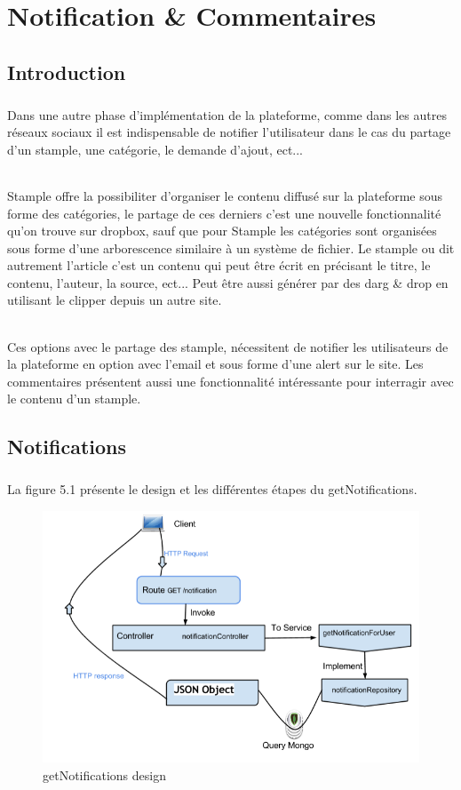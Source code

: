 \chapter{Notification \& Commentaires}
\section{Introduction}
\paragraph{}
Dans une autre phase d'implémentation de la plateforme, comme dans les autres réseaux sociaux il est indispensable de notifier l'utilisateur dans le cas du partage d'un stample, une catégorie, le demande d'ajout, ect...
\subparagraph{}
Stample offre la possibiliter d'organiser le contenu diffusé sur la plateforme sous forme des catégories, le partage de ces derniers c'est une nouvelle fonctionnalité qu'on trouve sur dropbox, sauf que pour Stample les catégories sont organisées sous forme d'une arborescence similaire à un système de fichier.
\newline
Le stample ou dit autrement l'article c'est un contenu qui peut être écrit en précisant le titre, le contenu, l'auteur, la source, ect...
Peut être aussi générer par des darg \& drop en utilisant le clipper depuis un autre site.
\subparagraph{}
Ces options avec le partage des stample, nécessitent de notifier les utilisateurs de la plateforme en option avec l'email et sous forme d'une alert sur le site.
\newline
Les commentaires présentent aussi une fonctionnalité intéressante pour interragir avec le contenu d'un stample.
\section{Notifications}
\paragraph{}
La figure 5.1 présente le design et les différentes étapes du getNotifications.
\begin{figure}[H]
        \centering
                \centering
                \includegraphics[width=\textwidth]{Notifications.png}
               \caption{getNotifications design}
		\label{fig:getNotifications design}
\end{figure}
